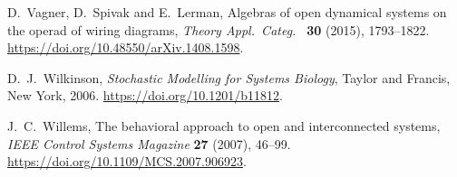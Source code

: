 \documentclass[a4paper,onecolumn, superscriptaddress,10pt, accepted=2022-03-25, issue=SS, volume=VV, shorttitle=papers/compositionality-VV-SS]{compositionalityarticle}
\begin{document}
\begin{thebibliography}{100}
 D.\ Vagner, D.\ Spivak and E.\ Lerman, Algebras of open dynamical systems on the operad of wiring diagrams, \textsl{Theory Appl.\ Categ.\ } \textbf{30} (2015), 1793--1822. \href{https://doi.org/10.48550/arXiv.1408.1598}{https://doi.org/10.48550/arXiv.1408.1598}.

 D.\ J.\ Wilkinson, \textsl{Stochastic Modelling for Systems Biology},
Taylor and Francis, New York, 2006. \href{https://doi.org/10.1201/b11812}{https://doi.org/10.1201/b11812}.

 J.\ C.\ Willems, The behavioral approach to open and interconnected systems, \textsl{IEEE Control Systems Magazine} \textbf{27} 
(2007), 46--99. \href{https://doi.org/10.1109/MCS.2007.906923}{https://doi.org/10.1109/MCS.2007.906923}.

\end{thebibliography}
\end{document}
